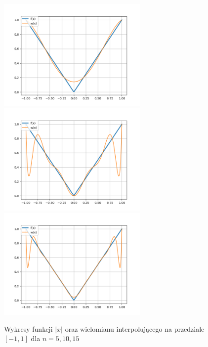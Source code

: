 \documentclass{article}
\begin{document}
\begin{figure}[H]
    \centering
    \includegraphics[width=0.65\textwidth]{plots/6a_5.png}
    \includegraphics[width=0.65\textwidth]{plots/6a_10.png}
    \includegraphics[width=0.65\textwidth]{plots/6a_15.png}
    \caption{Wykresy funkcji $|x|$ oraz wielomianu interpolującego na przedziale 
    $[-1,1]$ dla $n=5,10,15$}
\end{figure}
\end{document}
